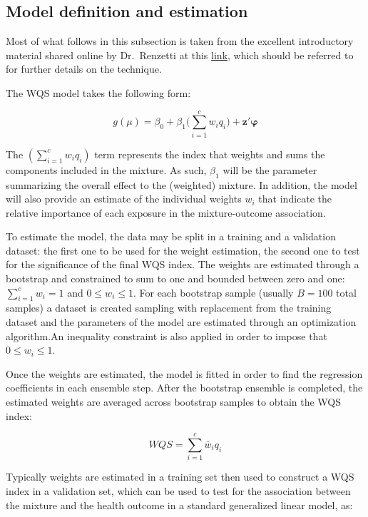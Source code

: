 \documentclass[
]{book}
\begin{document}
\hypertarget{model-definition-and-estimation}{%
\subsection{Model definition and estimation}\label{model-definition-and-estimation}}

Most of what follows in this subsection is taken from the excellent introductory material shared online by Dr.~Renzetti at this \href{https://cran.r-project.org/web/packages/gWQS/vignettes/gwqs-vignette.html}{link}, which should be referred to for further details on the technique.

The WQS model takes the following form:

\begin{equation} \label{eq:wqs}
g(\mu) = \beta_0 + \beta_1\Bigg(\sum_{i=1}^{c}w_iq_i\Bigg) + \boldsymbol{z'\varphi}
\end{equation}

The \((\sum_{i=1}^{c}w_iq_i)\) term represents the index that weights and sums the components included in the mixture. As such, \(\beta_1\) will be the parameter summarizing the overall effect to the (weighted) mixture. In addition, the model will also provide an estimate of the individual weights \(w_i\) that indicate the relative importance of each exposure in the mixture-outcome association.

To estimate the model, the data may be split in a training and a validation dataset: the first one to be used for the weight estimation, the second one to test for the significance of the final WQS index. The weights are estimated through a bootstrap and constrained to sum to one and bounded between zero and one: \(\sum_{i=1}^{c}w_i=1\) and \(0 \leq w_i \leq 1\). For each bootstrap sample (usually \(B=100\) total samples) a dataset is created sampling with replacement from the training dataset and the parameters of the model are estimated through an optimization algorithm.An inequality constraint is also applied in order to impose that \(0 \leq w_i \leq 1\).

Once the weights are estimated, the model is fitted in order to find the regression coefficients in each ensemble step. After the bootstrap ensemble is completed, the estimated weights are averaged across bootstrap samples to obtain the WQS index:

\[WQS = \sum_{i=1}^c \bar{w}_iq_i\]

Typically weights are estimated in a training set then used to construct a WQS index in a validation set, which can be used to test for the association between the mixture and the health outcome in a standard generalized linear model, as:
\end{document}
